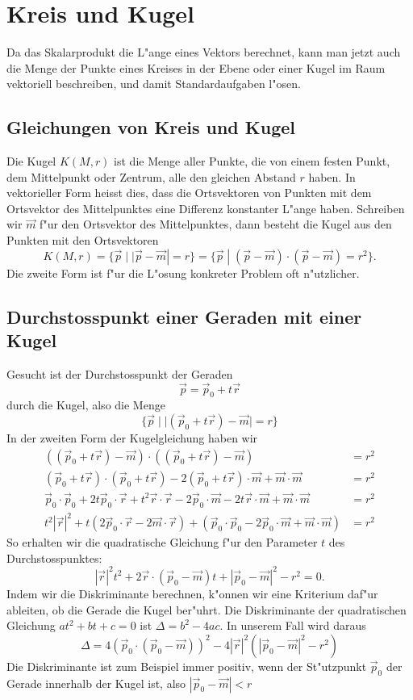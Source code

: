 \section{Kreis und Kugel}
Da das Skalarprodukt die L"ange eines Vektors berechnet, kann man
jetzt auch die Menge der Punkte eines Kreises in der Ebene
oder einer Kugel im Raum vektoriell beschreiben, und damit Standardaufgaben
l"osen.
\subsection{Gleichungen von Kreis und Kugel}
Die Kugel $K(M,r)$ ist die Menge aller Punkte, die von einem festen Punkt, dem
Mittelpunkt oder Zentrum, alle den gleichen Abstand $r$ haben.
In vektorieller
Form heisst dies, dass die Ortsvektoren von Punkten mit dem Ortsvektor des
Mittelpunktes eine Differenz konstanter L"ange haben.
Schreiben wir $\vec m$
f"ur den Ortsvektor des Mittelpunktes, dann besteht die Kugel aus den
Punkten mit den Ortsvektoren
\[
K(M,r)
=
\{\vec p\;| \;|\vec p-\vec m|=r\}
=
\{\vec p\;| \;(\vec p-\vec m)\cdot(\vec p-\vec m)=r^2\}.
\]
Die zweite Form ist f"ur die L"osung konkreter Problem oft n"utzlicher.
\subsection{Durchstosspunkt einer Geraden mit einer Kugel
\label{durchstosspunktkugel}}
Gesucht ist der Durchstosspunkt der Geraden
\[
\vec p=\vec p_0+t\vec r
\]
durch die Kugel, also die Menge
\[
\{\vec p\;| \;|(\vec p_0+t\vec r)-\vec m|=r\}
\]
In der zweiten Form der Kugelgleichung haben wir
\begin{align*}
((\vec p_0+t\vec r)-\vec m)
\cdot
((\vec p_0+t\vec r)-\vec m)&=r^2
\\
(\vec p_0+t\vec r)
\cdot
(\vec p_0+t\vec r)
-2
(\vec p_0+t\vec r)\cdot \vec m
+\vec m\cdot\vec m&=r^2
\\
\vec p_0\cdot\vec p_0
+2t\vec p_0\cdot\vec r
+t^2\vec r\cdot\vec r
-2\vec p_0\cdot\vec m
-2t\vec r\cdot\vec m
+\vec m\cdot\vec m&=r^2
\\
t^2|\vec r|^2
+t(2\vec p_0\cdot\vec r-2\vec m\cdot\vec r)
+(\vec p_0\cdot\vec p_0-2\vec p_0\cdot\vec m+\vec m\cdot\vec m)&=r^2
\end{align*}
So erhalten wir die quadratische Gleichung f"ur den Parameter $t$
des Durchstosspunktes:
\[
|\vec r|^2t^2
+2\vec r\cdot(\vec p_0-\vec m)t
+|\vec p_0-\vec m|^2-r^2 =0.
\]
Indem wir die Diskriminante berechnen,  k"onnen wir eine Kriterium
daf"ur ableiten, ob die Gerade die Kugel ber"uhrt.
Die Diskriminante
der quadratischen Gleichung $at^2+bt+c=0$ ist $\Delta = b^2-4ac$.
In unserem
Fall wird daraus
\[
\Delta
=
4(\vec p_0\cdot(\vec p_0-\vec m))^2-
4|\vec r|^2(
|\vec p_0-\vec m|^2-r^2
)
\]
Die Diskriminante ist zum Beispiel immer positiv, wenn der St"utzpunkt
$\vec p_0$
der Gerade innerhalb der Kugel ist, also $|\vec p_0-\vec m|<r$
